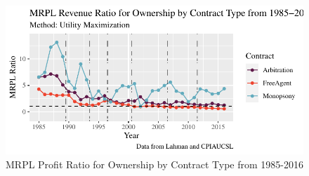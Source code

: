 \documentclass[
  12pt,
  letterpaper,
  DIV=11,
  numbers=noendperiod]{scrartcl}
\begin{document}
\begin{figure}

{\centering \includegraphics{FullDraft3_files/figure-pdf/fig-ContractRSRC-1.pdf}

}

\caption{\label{fig-ContractRSRC}MRPL Profit Ratio for Ownership by
Contract Type from 1985-2016}

\end{figure}
\end{document}
